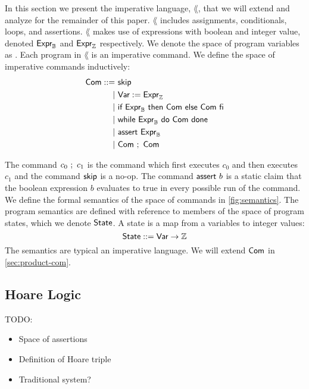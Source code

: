 \documentclass[p.tex]{subfiles}
\begin{document}
In this section we present the imperative language, $\lang$, that we will extend
and analyze for the remainder of this paper.
$\lang$ includes
assignments, conditionals, loops, and assertions.
%
$\lang$ makes use of expressions with boolean and integer
value, denoted $\textsf{Expr}_{\mathbb{B}}$ and $\textsf{Expr}_{\mathbb{Z}}$ respectively.
%
We denote the space of program variables as \var.
%
Each program in $\lang$ is an imperative command.
We define the space of imperative commands inductively:
\begin{align*}
  \textsf{Com} ::=&~\textsf{skip}\\
         |&~\textsf{Var} := \textsf{Expr}_{\mathbb{Z}}\\
         |&~\textsf{if}~\textsf{Expr}_{\mathbb{B}}~\textsf{then}~\textsf{Com}~\textsf{else}~\textsf{Com}~\textsf{fi}\\
         |&~\textsf{while}~\textsf{Expr}_{\mathbb{B}}~\textsf{do}~\textsf{Com}~\textsf{done}\\
         |&~\textsf{assert}~\textsf{Expr}_{\mathbb{B}}\\
         |&~\textsf{Com}~;~\textsf{Com}
\end{align*}

The command $c_0~;~c_1$ is the command which first executes
$c_0$ and then executes $c_1$ and the command $\textsf{skip}$ is a no-op. The
command $\textsf{assert}~b$ is a static claim that the boolean expression
$b$ evaluates to true in every possible run of the command. We define
the formal semantics of the space of commands in \cref{fig:semantics}.
%
The program semantics are defined with reference to members of the
space of program states, which we denote $\textsf{State}$. A state
is a map from a variables to integer values:
%
\[\textsf{State} ::= \textsf{Var} \rightarrow \mathbb{Z}\]
%
The semantics are typical an imperative language. We will extend
$\textsf{Com}$ in \cref{sec:product-com}.

\subsection{Hoare Logic}

TODO:
\begin{itemize}
  \item Space of assertions
  \item Definition of Hoare triple
  \item Traditional system?
\end{itemize}
\end{document}
